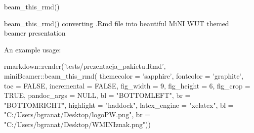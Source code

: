 \documentclass[ignorenonframetext,]{beamer}
\newenvironment{Shaded}{}{}
\newcommand{\KeywordTok}[1]{\textcolor[rgb]{0.00,0.00,1.00}{#1}}
\newcommand{\DataTypeTok}[1]{#1}
\newcommand{\DecValTok}[1]{#1}
\newcommand{\StringTok}[1]{\textcolor[rgb]{0.00,0.50,0.50}{#1}}
\newcommand{\OtherTok}[1]{\textcolor[rgb]{1.00,0.25,0.00}{#1}}
\newcommand{\OperatorTok}[1]{#1}
\newcommand{\NormalTok}[1]{#1}
\begin{document}
\begin{frame}[fragile]{beam\_this\_rmd()}

beam\_this\_rmd() converting .Rmd file into beautiful MiNI WUT themed
beamer presentation

An example usage:

\scriptsize

\begin{Shaded}
\begin{Highlighting}[]
\NormalTok{rmarkdown}\OperatorTok{::}\KeywordTok{render}\NormalTok{(}\StringTok{'tests/prezentacja_pakietu.Rmd'}\NormalTok{, }
\NormalTok{    miniBeamer}\OperatorTok{::}\KeywordTok{beam_this_rmd}\NormalTok{(}
      \DataTypeTok{themecolor =} \StringTok{'sapphire'}\NormalTok{,}
      \DataTypeTok{fontcolor =} \StringTok{'graphite'}\NormalTok{,}
      \DataTypeTok{toc =} \OtherTok{FALSE}\NormalTok{,}
      \DataTypeTok{incremental =} \OtherTok{FALSE}\NormalTok{,}
      \DataTypeTok{fig_width =} \DecValTok{9}\NormalTok{,}
      \DataTypeTok{fig_height =} \DecValTok{6}\NormalTok{,}
      \DataTypeTok{fig_crop =} \OtherTok{TRUE}\NormalTok{,}
      \DataTypeTok{pandoc_args =} \OtherTok{NULL}\NormalTok{,}
      \DataTypeTok{bl =} \StringTok{"BOTTOMLEFT"}\NormalTok{,}
      \DataTypeTok{br =} \StringTok{"BOTTOMRIGHT"}\NormalTok{,}
      \DataTypeTok{highlight =} \StringTok{"haddock"}\NormalTok{,}
      \DataTypeTok{latex_engine =} \StringTok{"xelatex"}\NormalTok{,}
      \DataTypeTok{bl =} \StringTok{"C:/Users/bgranat/Desktop/logoPW.png"}\NormalTok{,}
      \DataTypeTok{br =} \StringTok{"C:/Users/bgranat/Desktop/WMINIznak.png"}\NormalTok{))}
\end{Highlighting}
\end{Shaded}

\end{frame}
\end{document}
